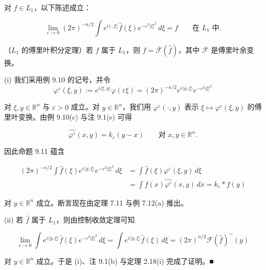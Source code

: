 \begin{theorem}

对 $ f \in L_1 $，以下陈述成立：

\begin{subitems}
\item

\[ \lim_{\varepsilon\to0}(2\pi)^{-n/2}\int e^{i\langle\cdot,\xi\rangle}\widehat{f}(\xi)e^{-\varepsilon^2|\xi|^2}\,d\xi = f \qquad \text{在 } L_1 \text{ 中} . \]

\item

（$ L_1 $ 的傅里叶积分定理）若 $ \widehat{f} $ 属于 $ L_1 $，则 $ f = \overline{\mathcal{F}}(\widehat{f}) $，其中 $ \overline{\mathcal{F}} $ 是傅里叶余变换。

\proofhead
(i) 我们采用例 9.10 的记号，并令
\[
\varphi^\varepsilon(\xi,y) := e^{i\langle\xi,y\rangle}\varphi(\varepsilon\xi) = (2\pi)^{-n/2}e^{i\langle y,\xi\rangle}e^{-\varepsilon^2|\xi|^2}
\]

对 $ \xi,y \in \mathbb{R}^n $ 与 $ \varepsilon > 0 $ 成立。对 $ y \in \mathbb{R}^n $，我们用 $ \widehat{\varphi^\varepsilon}(\cdot,y) $ 表示 $ \xi \mapsto \varphi^\varepsilon(\xi,y) $ 的傅里叶变换。由例 9.10(c) 与注 9.1(e) 可得

\[
\widehat{\varphi^\varepsilon}(x,y) = k_\varepsilon(y-x) \qquad \text{对 } x,y \in \mathbb{R}^n .
\]

因此命题 9.11 蕴含

\begin{equation*}
\begin{aligned}
(2\pi)^{-n/2}\int\widehat{f}(\xi)e^{i\langle y,\xi\rangle}e^{-\varepsilon^2|\xi|^2}\,d\xi &= \int\widehat{f}(\xi)\varphi^\varepsilon(\xi,y)\,d\xi \\ &= \int f(x)\widehat{\varphi^\varepsilon}(x,y)\,dx = k_\varepsilon*f(y)
\end{aligned}
\end{equation*}

对 $ y \in \mathbb{R}^n $ 成立。断言现在由定理 7.11 与例 7.12(a) 推出。

\end{subitems}

(ii) 若 $ \widehat{f} $ 属于 $ L_1 $，则由控制收敛定理可知

\[
\lim_{\varepsilon\to0}\int e^{i\langle y,\xi\rangle}\widehat{f}(\xi)e^{-\varepsilon^2|\xi|^2}\,d\xi = \int e^{i\langle y,\xi\rangle}\widehat{f}(\xi)\,d\xi = (2\pi)^{n/2}\mathcal{F}(\widehat{f})^{\sim}(y)
\]

对 $ y \in \mathbb{R}^n $ 成立。于是 (i)、注 9.1(b) 与定理 2.18(i) 完成了证明。\nobreak\hspace{0.35em}■

\end{theorem}

